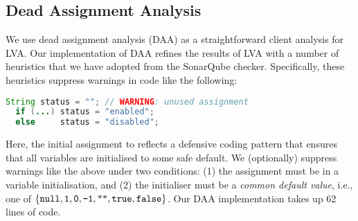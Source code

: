 \subsection{Dead Assignment Analysis}\label{sec:daa}
We use dead assignment analysis (DAA) as a straightforward client analysis for LVA.
Our implementation of DAA refines the results of LVA with a number of heuristics that we have
adopted from the SonarQube checker.  Specifically, these heuristics suppress warnings in code like the following:
\begin{lstlisting}[language=java]
  String status = ""; // WARNING: unused assignment
  if (...) status = "enabled";
  else     status = "disabled";
\end{lstlisting}
Here, the initial assignment to  reflects a defensive coding pattern
that ensures that all variables are initialised to some safe default.
We (optionally) suppress warnings like the above under two conditions:
(1) the assignment must be in a variable initialisation, and (2)
the initialiser must be a \emph{common default value}, i.e., one of
$\{ \code{null}, \code{1}, \code{0}, \code{-1}, \code{""}, \code{true}, \code{false} \}$.
Our DAA implementation takes up 62 lines of code.



